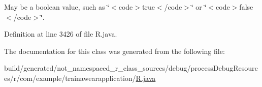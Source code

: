 May be a boolean value, such as \char`\"{}$<$code$>$true$<$/code$>$\char`\"{} or \char`\"{}$<$code$>$false$<$/code$>$\char`\"{}. 

Definition at line 3426 of file R.\+java.



The documentation for this class was generated from the following file\+:\begin{DoxyCompactItemize}
\item 
build/generated/not\+\_\+namespaced\+\_\+r\+\_\+class\+\_\+sources/debug/process\+Debug\+Resources/r/com/example/trainawearapplication/\mbox{\hyperlink{com_2example_2trainawearapplication_2_r_8java}{R.\+java}}\end{DoxyCompactItemize}
